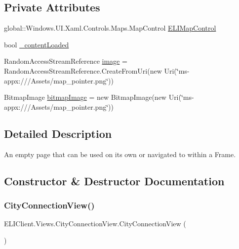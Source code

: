 \subsection*{Private Attributes}
\begin{DoxyCompactItemize}
\item 
global\+::\+Windows.\+U\+I.\+Xaml.\+Controls.\+Maps.\+Map\+Control \hyperlink{class_e_l_i_client_1_1_views_1_1_city_connection_view_ae5842a6a397aa27b2a4b1de03460afdf}{E\+L\+I\+Map\+Control}
\item 
bool \hyperlink{class_e_l_i_client_1_1_views_1_1_city_connection_view_a2af70649161e86207da6b08313814377}{\+\_\+content\+Loaded}
\item 
Random\+Access\+Stream\+Reference \hyperlink{class_e_l_i_client_1_1_views_1_1_city_connection_view_a498a1c4fc7826caab708fbd5148a92c5}{image} = Random\+Access\+Stream\+Reference.\+Create\+From\+Uri(new Uri(\char`\"{}ms-\/appx\+:///Assets/map\+\_\+pointer.\+png\char`\"{}))
\item 
Bitmap\+Image \hyperlink{class_e_l_i_client_1_1_views_1_1_city_connection_view_a276cb706f6ba57c6c4529e28e6e3cbce}{bitmap\+Image} = new Bitmap\+Image(new Uri(\char`\"{}ms-\/appx\+:///Assets/map\+\_\+pointer.\+png\char`\"{}))
\end{DoxyCompactItemize}


\subsection{Detailed Description}
An empty page that can be used on its own or navigated to within a Frame. 



\subsection{Constructor \& Destructor Documentation}
\mbox{\label{class_e_l_i_client_1_1_views_1_1_city_connection_view_a7cbd9995c6d5b65090de9dc901ca56ab}} 
\subsubsection{\texorpdfstring{City\+Connection\+View()}{CityConnectionView()}}
{\footnotesize\ttfamily E\+L\+I\+Client.\+Views.\+City\+Connection\+View.\+City\+Connection\+View (\begin{DoxyParamCaption}{ }\end{DoxyParamCaption})\hspace{0.3cm}{\ttfamily [inline]}}



